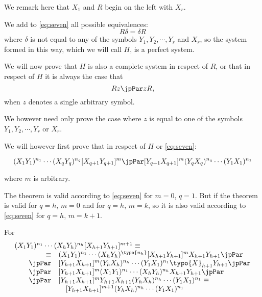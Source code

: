 We remark here 
that $X_1$ and $R$ begin on the left with $X_r$.

We add to \eqref{eq:seven} all possible equivalences:
$$R \delta = \delta R$$
where $\delta$ is not equal to any of the symbols $Y_1,Y_2,\cdots,Y_r$
and $X_r$, so the system formed in this way, which we will call $H$,
is a perfect system.

We will now prove that $H$ is also a complete system in respect of
$R$, or that in respect of $H$ it is always the case that
$$R z \jpPar z R,$$
when $z$ denotes a single arbitrary symbol.

We however need only prove the case where $z$ is equal to one of the
symbols $Y_1,Y_2,\cdots,Y_r$ or $X_r$.

We will however first prove that in respect of $H$ or
\eqref{eq:seven}:

\parbox{1.15\textwidth}{\begin{equation}
(X_1Y_1)^{n_1}\cdots(X_qY_q)^{n_q}[X_{q+1}Y_{q+1}]^m
\jpPar
[Y_{q+1}X_{q+1}]^m(Y_qX_q)^{n_q}\cdots(Y_1X_1)^{n_1}
\label{eq:eight}
\end{equation}}
where $m$ is arbitrary.

\bigskip

The theorem is valid according to \eqref{eq:seven} for $m=0$, $q=1$.
But if the theorem is valid for $q=h$, $m=0$ and for $q=h$, $m=k$, so it is
also valid according to \eqref{eq:seven} for $q=h$, $m=k+1$.

For
$$
\begin{array}{rl}
\multicolumn{2}{l}{(X_1Y_1)^{n_1}\cdots(X_hY_h)^{n_h} [X_{h+1}Y_{h+1}]^{m+1} \equiv} \\
\qquad \equiv & (X_1Y_1)^{n_1}\cdots(X_hY_h)^{\typo{n_h}}[X_{h+1}Y_{h+1}]^{m}X_{h+1}Y_{h+1}
\jpPar \\
\qquad \jpPar &[Y_{h+1}X_{h+1}]^m(Y_hX_h)^{n_h}\cdots(Y_1X_1)^{n_1}\typo{X}_{h+1}Y_{h+1}
\jpPar \\
\qquad \jpPar &[Y_{h+1}X_{h+1}]^m(X_1Y_1)^{n_1}\cdots(X_hY_h)^{n_h}X_{h+1}Y_{h+1}
\jpPar \\
\qquad \jpPar &[Y_{h+1}X_{h+1}]^m Y_{h+1}X_{h+1}(Y_hX_h)^{n_h}\cdots(Y_1X_1)^{n_1}
\equiv \\
& \quad [Y_{h+1}X_{h+1}]^{m+1}(Y_hX_h)^{n_h}\cdots(Y_1X_1)^{n_1}\\
\end{array}$$

